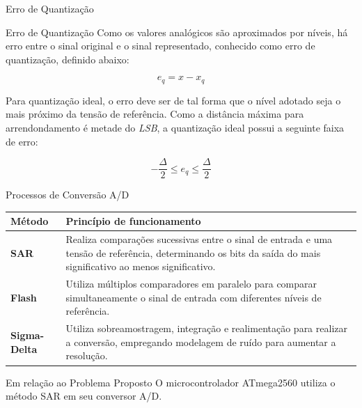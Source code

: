 \documentclass{beamer}
\begin{document}
\begin{frame}{Erro de Quantização}

    \begin{alertblock}{Erro de Quantização}
        Como os valores analógicos são aproximados por níveis, há erro entre o sinal original e o sinal representado, conhecido como erro de quantização, definido abaixo:

        \begin{equation}
            e_q = x - x_q
        \end{equation}

        Para quantização ideal, o erro deve ser de tal forma que o nível adotado seja o mais próximo da tensão de referência. Como a distância máxima para arrendondamento é metade do \textit{LSB}, a quantização ideal possui a seguinte faixa de erro:

        \begin{equation}
            -\frac{\Delta}{2} \leq e_q \leq \frac{\Delta}{2}
        \end{equation}
    \end{alertblock}
    
\end{frame}

\begin{frame}{Processos de Conversão A/D}

    \begin{tabular}{|>{\centering\arraybackslash}m{2.5cm}|
                >{\centering\arraybackslash}m{8.5cm}|}
        \hline
        \textbf{Método} & \textbf{Princípio de funcionamento} \\
        \hline
        \textbf{SAR} &
        Realiza comparações sucessivas entre o sinal de entrada e uma tensão de referência, determinando os bits da saída do mais significativo ao menos significativo. \\
        \hline
        \textbf{Flash} &
        Utiliza múltiplos comparadores em paralelo para comparar simultaneamente o sinal de entrada com diferentes níveis de referência. \\
        \hline
        \textbf{Sigma-Delta} &
        Utiliza sobreamostragem, integração e realimentação para realizar a conversão, empregando modelagem de ruído para aumentar a resolução. \\
        \hline
    \end{tabular}

    \begin{exampleblock}{Em relação ao Problema Proposto}
        O microcontrolador ATmega2560 utiliza o método SAR em seu conversor A/D.
    \end{exampleblock}
    
\end{frame}
\end{document}
